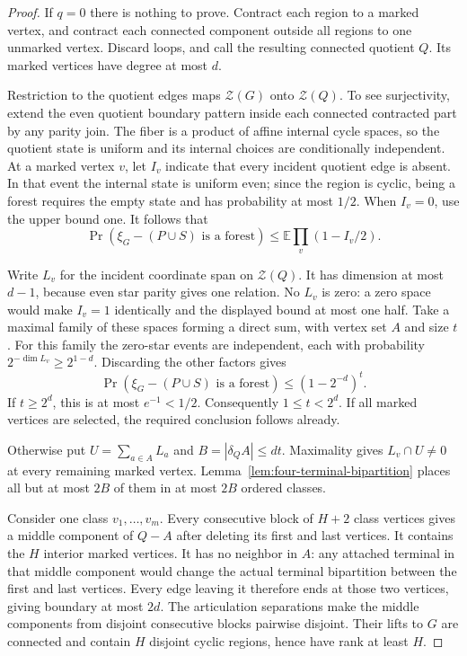 \begin{proof}
If $q=0$ there is nothing to prove.
Contract each region to a marked vertex, and contract each connected component outside all regions to one unmarked vertex.
Discard loops, and call the resulting connected quotient $Q$.
Its marked vertices have degree at most $d$.

Restriction to the quotient edges maps $\mathcal Z(G)$ onto $\mathcal Z(Q)$.
To see surjectivity, extend the even quotient boundary pattern inside each connected contracted part by any parity join.
The fiber is a product of affine internal cycle spaces, so the quotient state is uniform and its internal choices are conditionally independent.
At a marked vertex $v$, let $I_v$ indicate that every incident quotient edge is absent.
In that event the internal state is uniform even; since the region is cyclic, being a forest requires the empty state and has probability at most $1/2$.
When $I_v=0$, use the upper bound one.
It follows that
\[
 \Pr(\xi_G-(P\cup S)\text{ is a forest})
 \le\mathbb E\prod_v(1-I_v/2).
\]

Write $L_v$ for the incident coordinate span on $\mathcal Z(Q)$.
It has dimension at most $d-1$, because even star parity gives one relation.
No $L_v$ is zero: a zero space would make $I_v=1$ identically and the displayed bound at most one half.
Take a maximal family of these spaces forming a direct sum, with vertex set $A$ and size $t$.
For this family the zero-star events are independent, each with probability
$2^{-\dim L_v}\ge2^{1-d}$.
Discarding the other factors gives
\[
 \Pr(\xi_G-(P\cup S)\text{ is a forest})
 \le(1-2^{-d})^t.
\]
If $t\ge2^d$, this is at most $e^{-1}<1/2$.
Consequently $1\le t<2^d$.
If all marked vertices are selected, the required conclusion follows already.

Otherwise put $U=\sum_{a\in A}L_a$ and $B=|\delta_QA|\le dt$.
Maximality gives $L_v\cap U\ne0$ at every remaining marked vertex.
Lemma~\ref{lem:four-terminal-bipartition} places all but at most $2B$ of them in at most $2B$ ordered classes.

Consider one class $v_1,\ldots,v_m$.
Every consecutive block of $H+2$ class vertices gives a middle component of $Q-A$ after deleting its first and last vertices.
It contains the $H$ interior marked vertices.
It has no neighbor in $A$: any attached terminal in that middle component would change the actual terminal bipartition between the first and last vertices.
Every edge leaving it therefore ends at those two vertices, giving boundary at most $2d$.
The articulation separations make the middle components from disjoint consecutive blocks pairwise disjoint.
Their lifts to $G$ are connected and contain $H$ disjoint cyclic regions, hence have rank at least $H$.


\end{proof}
